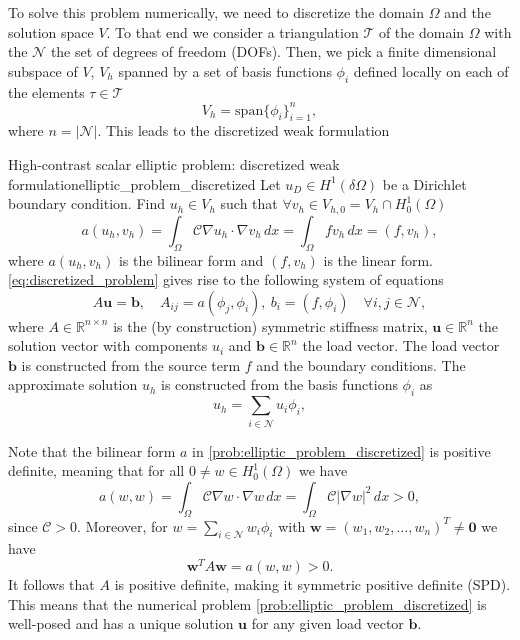 To solve this problem numerically, we need to discretize the domain $\Omega$ and the solution space $V$. To that end we consider a triangulation $\mathcal{T}$ of the domain $\Omega$ with the $\mathcal{N}$ the set of degrees of freedom (DOFs). Then, we pick a finite dimensional subspace of $V$, $V_h$ spanned by a set of basis functions $\phi_i$ defined locally on each of the elements $\tau \in \mathcal{T}$
\begin{equation*}
  V_h = \text{span}\{\phi_i\}_{i=1}^{n},
\end{equation*}
where $n = |\mathcal{N}|$. This leads to the discretized weak formulation
\begin{fancyprob}{High-contrast scalar elliptic problem: discretized weak formulation}{elliptic_problem_discretized}
    Let $u_D\in H^1(\delta\Omega)$ be a Dirichlet boundary condition. Find $u_h\in V_h$ such that $\forall v_h \in V_{h,0} = V_h\cap H^1_0(\Omega)$
    \begin{equation}
        a(u_h, v_h) = \int_\Omega \mathcal{C}\nabla u_h\cdot\nabla v_h\,dx = \int_\Omega f v_h \,dx = (f, v_h),
        \label{eq:discretized_problem}
    \end{equation}
    where $a(u_h, v_h)$ is the bilinear form and $(f, v_h)$ is the linear form. \cref{eq:discretized_problem} gives rise to the following system of equations
    \begin{equation*}
        A\mathbf{u} = \mathbf{b}, \quad A_{ij} = a(\phi_j, \phi_i), \ b_i = (f, \phi_i) \quad \forall i,j\in\mathcal{N},
    \end{equation*}
    where $A\in\mathbb{R}^{n \times n}$ is the (by construction) symmetric stiffness matrix, $\mathbf{u}\in\mathbb{R}^{n}$ the solution vector with components $u_i$ and $\mathbf{b}\in\mathbb{R}^{n}$ the load vector. The load vector $\mathbf{b}$ is constructed from the source term $f$ and the boundary conditions. The approximate solution $u_h$ is constructed from the basis functions $\phi_i$ as
    \begin{equation*}
        u_h = \sum_{i\in\mathcal{N}} u_i \phi_i,
    \end{equation*}
\end{fancyprob}
Note that the bilinear form $a$ in \cref{prob:elliptic_problem_discretized} is positive definite, meaning that for all $0\neq w\in H^1_0(\Omega)$ we have
\begin{equation*}
  a(w,w) = \int_\Omega \mathcal{C} \nabla w\cdot\nabla w\,dx = \int_\Omega \mathcal{C} |\nabla w|^2\,dx > 0,
\end{equation*}
since $\mathcal{C}>0$. Moreover, for $w = \sum_{i\in\mathcal{N}} w_i \phi_i$ with $\mathbf{w} = (w_1, w_2, \ldots, w_n)^T \neq \mathbf{0}$ we have
\begin{equation*}
    \mathbf{w}^T A \mathbf{w} = a(w,w) > 0.
\end{equation*}
It follows that $A$ is positive definite, making it symmetric positive definite (SPD). This means that the numerical problem \cref{prob:elliptic_problem_discretized} is well-posed and has a unique solution $\mathbf{u}$ for any given load vector $\mathbf{b}$.

